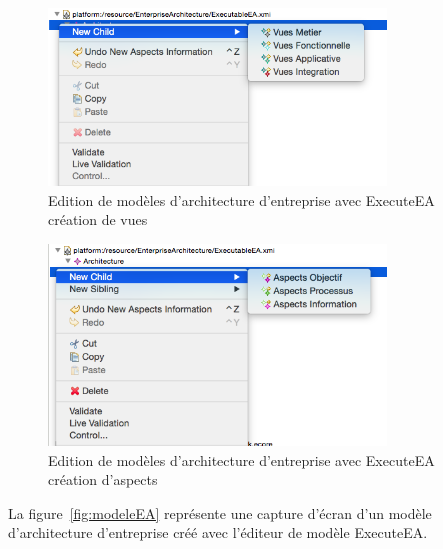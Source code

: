     \begin{figure}[!htbp]
      \centering
      \includegraphics[width=0.8\textwidth]{figures/5_implementation/editeur_modele1.png}
     \caption{Edition de modèles d'architecture d'entreprise avec ExecuteEA\\création de vues}
     \label{fig:editeur_modele1}
    \end{figure}

    \begin{figure}[!htbp]
      \centering
      \includegraphics[width=0.8\textwidth]{figures/5_implementation/editeur_modele2.png}
     \caption{Edition de modèles d'architecture d'entreprise avec ExecuteEA\\création d'aspects}
     \label{fig:editeur_modele2}
    \end{figure}

    La figure~\ref{fig:modeleEA} représente une capture d'écran d'un modèle d'architecture
    d'entreprise créé avec l'éditeur de modèle ExecuteEA.

